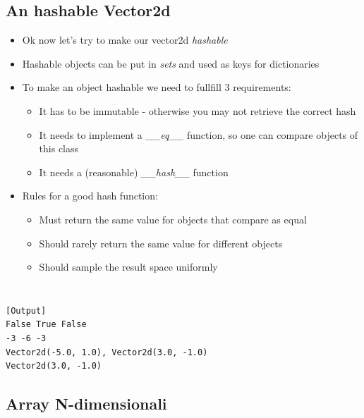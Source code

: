 \subsection{An hashable Vector2d}
  \begin{itemize}
    \item Ok now let's try to make our vector2d \emph{hashable}
    \item Hashable objects can be put in \emph{sets} and used as keys for 
          dictionaries
    \item To make an object hashable we need to fullfill 3 requirements:
    \begin{itemize}
      \item It has to be immutable - otherwise you may not retrieve the correct hash
      \item It needs to implement a \emph{\_\_eq\_\_} function, so one can compare
            objects of this class
      \item It needs a (reasonable) \emph{\_\_hash\_\_} function
    \end{itemize}
    \item Rules for a good hash function:
    \begin{itemize}
      \item Must return the same value for objects that compare as equal
      \item Should rarely return the same value for different objects
      \item Should sample the result space uniformly
    \end{itemize}
    
  \end{itemize}


\inputminted{python}{snippets/vector2d_hashable.py}

\inputminted{python}{snippets/vector2d_hashable_test.py}

\begin{verbatim}
[Output]
False True False
-3 -6 -3
Vector2d(-5.0, 1.0), Vector2d(3.0, -1.0)
Vector2d(3.0, -1.0)
\end{verbatim}

\subsection{Array N-dimensionali}

